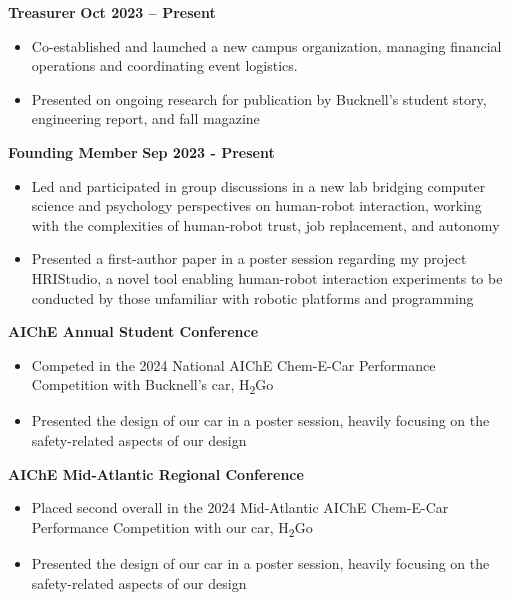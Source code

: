 \documentclass{article}
\begin{document}
 \hfill {}

\textbf{Treasurer} \hfill \textbf{Oct 2023 – Present}
\begin{itemize}[noitemsep,topsep=2pt]
    \item Co-established and launched a new campus organization, managing financial operations and coordinating event logistics.
    \item Presented on ongoing research for publication by Bucknell's student story, engineering report, and fall magazine
\end{itemize}

 \hfill {}

\textbf{Founding Member} \hfill \textbf{Sep 2023 - Present}
\begin{itemize}[noitemsep,topsep=2pt]
	\item Led and participated in group discussions in a new lab bridging computer science and psychology perspectives on human-robot interaction, working with the complexities of human-robot trust, job replacement, and autonomy
\end{itemize}


 \hfill {}
\begin{itemize}[noitemsep,topsep=2pt]
    \item Presented a first-author paper in a poster session regarding my project HRIStudio, a novel tool enabling human-robot interaction experiments to be conducted by those unfamiliar with robotic platforms and programming
\end{itemize}

\textbf{AIChE Annual Student Conference}  \hfill {}
\begin{itemize}[noitemsep,topsep=2pt]
    \item Competed in the 2024 National AIChE Chem-E-Car Performance Competition with Bucknell's car, H\textsubscript{2}Go
    \item Presented the design of our car in a poster session, heavily focusing on the safety-related aspects of our design
\end{itemize}

\textbf{AIChE Mid-Atlantic Regional Conference}  \hfill {}
\begin{itemize}[noitemsep,topsep=2pt]
    \item Placed second overall in the 2024 Mid-Atlantic AIChE Chem-E-Car Performance Competition with our car, H\textsubscript{2}Go
    \item Presented the design of our car in a poster session, heavily focusing on the safety-related aspects of our design
\end{itemize}
\end{document}
